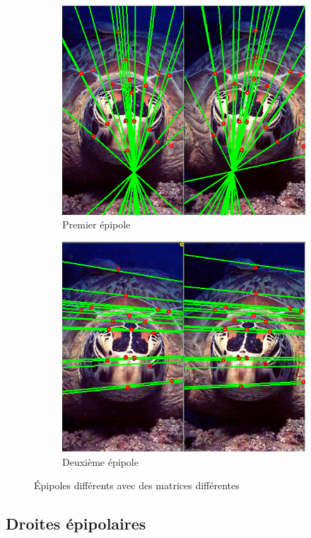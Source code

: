 \documentclass [a4 paper,11pt]{article}
\begin{document}
\begin{figure}
  \centering
  \begin{subfigure}{0.5\textwidth}
    \centering
    \includegraphics[width=0.8\linewidth]{epipole1.png}
    \caption{Premier épipole}
    \label{fig:epipole1}
  \end{subfigure}%
  \begin{subfigure}{0.5\textwidth}
    \centering
    \includegraphics[width=0.8\linewidth]{epipole2.png}
    \caption{Deuxième épipole}
    \label{fig:epipole2}
  \end{subfigure}
  \caption{Épipoles différents avec des matrices différentes}
  \label{fig:epipole}
\end{figure}

\subsection{Droites épipolaires}
\end{document}
